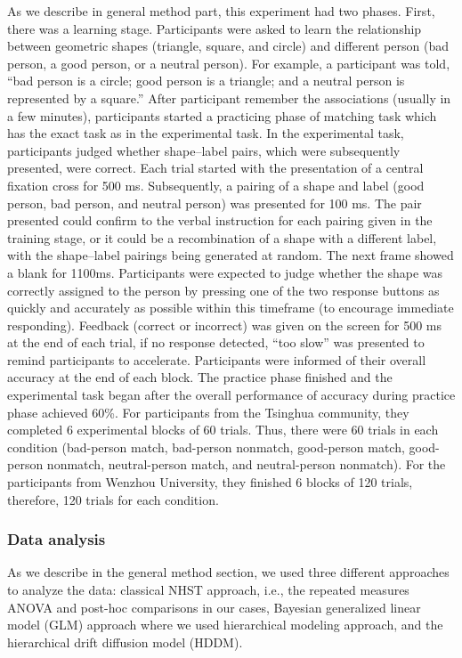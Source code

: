 \documentclass[
  english,
  man]{apa6}
\begin{document}
As we describe in general method part, this experiment had two phases. First, there was a learning stage. Participants were asked to learn the relationship between geometric shapes (triangle, square, and circle) and different person (bad person, a good person, or a neutral person). For example, a participant was told, \enquote{bad person is a circle; good person is a triangle; and a neutral person is represented by a square.} After participant remember the associations (usually in a few minutes), participants started a practicing phase of matching task which has the exact task as in the experimental task.
In the experimental task, participants judged whether shape--label pairs, which were subsequently presented, were correct. Each trial started with the presentation of a central fixation cross for 500 ms. Subsequently, a pairing of a shape and label (good person, bad person, and neutral person) was presented for 100 ms. The pair presented could confirm to the verbal instruction for each pairing given in the training stage, or it could be a recombination of a shape with a different label, with the shape--label pairings being generated at random. The next frame showed a blank for 1100ms. Participants were expected to judge whether the shape was correctly assigned to the person by pressing one of the two response buttons as quickly and accurately as possible within this timeframe (to encourage immediate responding). Feedback (correct or incorrect) was given on the screen for 500 ms at the end of each trial, if no response detected, \enquote{too slow} was presented to remind participants to accelerate. Participants were informed of their overall accuracy at the end of each block. The practice phase finished and the experimental task began after the overall performance of accuracy during practice phase achieved 60\%.
For participants from the Tsinghua community, they completed 6 experimental blocks of 60 trials. Thus, there were 60 trials in each condition (bad-person match, bad-person nonmatch, good-person match, good-person nonmatch, neutral-person match, and neutral-person nonmatch). For the participants from Wenzhou University, they finished 6 blocks of 120 trials, therefore, 120 trials for each condition.

\hypertarget{data-analysis}{%
\subsubsection{Data analysis}\label{data-analysis}}

As we describe in the general method section, we used three different approaches to analyze the data: classical NHST approach, i.e., the repeated measures ANOVA and post-hoc comparisons in our cases, Bayesian generalized linear model (GLM) approach where we used hierarchical modeling approach, and the hierarchical drift diffusion model (HDDM).
\end{document}
